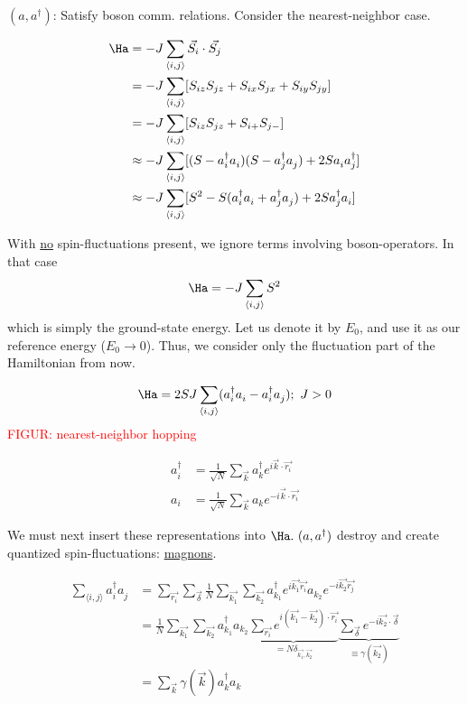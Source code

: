 $(a, a^\dagger)$: Satisfy boson comm. relations. Consider the nearest-neighbor case.

\begin{align}
    \Ha &= -J\sum_{\langle i,j \rangle} \Vec{S_i}\cdot\Vec{S_j} \\
    &= -J\sum_{\langle i, j \rangle}[S_{iz}S_{jz} + S_{ix}S_{jx} + S_{iy}S_{jy}]\\
    &= -J\sum_{\langle i, j \rangle}[S_{iz}S_{jz} + S_{i+}S_{j-}] \\
    &\approx -J\sum_{\langle i, j \rangle}[(S-a_i^\dagger a_i^{})(S-a_j^\dagger a_j^{}) + 2S a_i^{} a_j^\dagger]\\
    &\approx -J\sum_{\langle i, j \rangle}[S^2 - S(a_i^\dagger a_i^{} + a_j^\dagger a_j^{}) + 2S a_j^\dagger a_i^{}]
\end{align}

With \uline{no} spin-fluctuations present, we ignore terms involving boson-operators. In that case 
\begin{equation}
    \Ha = -J \sum_{\langle i, j \rangle} S^2
\end{equation}
which is simply the ground-state energy. Let us denote it by $E_0$, and use it as our reference energy ($E_0 \rightarrow 0$). Thus, we consider only the fluctuation part of the Hamiltonian from now.

\begin{equation}
    \Ha = 2SJ\sum_{\langle i, j \rangle} (a_i^\dagger a_i^{} - a_i^\dagger a_j^{}); \ J > 0
\end{equation}
\textcolor{red}{FIGUR: nearest-neighbor hopping}

\begin{align}
    a_i^\dagger &= \frac{1}{\sqrt{N}}\sum_{\Vec{k}}a_k^\dagger e^{i\Vec{k}\cdot\Vec{r_i}} \\
    a_i &= \frac{1}{\sqrt{N}}\sum_{\Vec{k}}a_k e^{-i\Vec{k}\cdot\Vec{r_i}}
\end{align}

We must next insert these representations into $\Ha. \ (a, a^\dagger)$ destroy and create quantized spin-fluctuations: \uline{magnons}.

\begin{align}
    \sum_{\langle i, j \rangle} a_i^\dagger a_j^{}
    &= \sum_{\Vec{r_i}}\sum_{\Vec{\delta}} \frac{1}{N}\sum_{\Vec{k_1}}\sum_{\Vec{k_2}}a_{k_1}^\dagger e^{i\Vec{k_1}\Vec{r_i}} a_{k_2} e^{-i\Vec{k_2}\Vec{r_j}} \\
    &= \frac{1}{N}\sum_{\Vec{k_1}}\sum_{\Vec{k_2}}a_{k_1}^\dagger a_{k_2} \underbrace{\sum_{\Vec{r_i}}e^{i(\Vec{k_1} - \Vec{k_2})\cdot\Vec{r_i}}}_{= N \delta_{\Vec{k_1}, \Vec{k_2}}} \underbrace{\sum_{\Vec{\delta}}e^{-i\Vec{k_2}\cdot \Vec{\delta}}}_{\equiv\gamma(\Vec{k_2})} \\
    &= \sum_{\Vec{k}}\gamma(\Vec{k})a_k^\dagger a_k^{}
\end{align}

